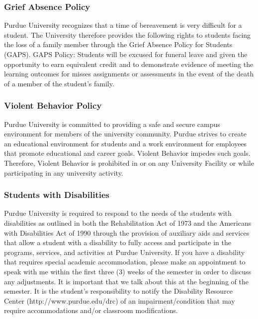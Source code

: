 \documentclass{article}
\begin{document}
\hypertarget{grief_absence_policy_24}{}\subsubsection*{{Grief Absence Policy}}\label{grief_absence_policy_24}

Purdue University recognizes that a time of bereavement is very difficult for a student. The University therefore provides the following rights to students facing the loss of a family member through the Grief Absence Policy for Students (GAPS). GAPS Policy: Students will be excused for funeral leave and given the opportunity to earn equivalent credit and to demonstrate evidence of meeting the learning outcomes for misses assignments or assessments in the event of the death of a member of the student'{}s family.

\hypertarget{violent_behavior_policy_25}{}\subsubsection*{{Violent Behavior Policy}}\label{violent_behavior_policy_25}

Purdue University is committed to providing a safe and secure campus environment for members of the university community. Purdue strives to create an educational environment for students and a work environment for employees that promote educational and career goals. Violent Behavior impedes such goals. Therefore, Violent Behavior is prohibited in or on any University Facility or while participating in any university activity.

\hypertarget{students_with_disabilities_26}{}\subsubsection*{{Students with Disabilities}}\label{students_with_disabilities_26}

Purdue University is required to respond to the needs of the students with disabilities as outlined in both the Rehabilitation Act of 1973 and the Americans with Disabilities Act of 1990 through the provision of auxiliary aids and services that allow a student with a disability to fully access and participate in the programs, services, and activities at Purdue University. If you have a disability that requires special academic accommodation, please make an appointment to speak with me within the first three (3) weeks of the semester in order to discuss any adjustments. It is important that we talk about this at the beginning of the semester. It is the student'{}s responsibility to notify the Disability Resource Center (http://www.purdue.edu/drc) of an impairment/condition that may require accommodations and/or classroom modifications.
\end{document}
